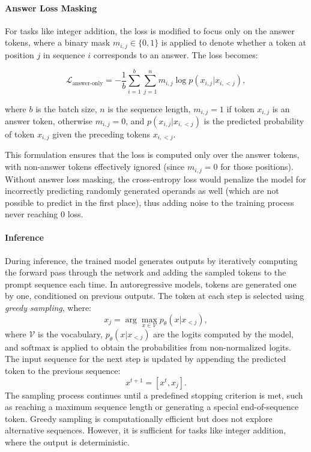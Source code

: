 \paragraph{Answer Loss Masking}
For tasks like integer addition, the loss is modified to focus only on the answer tokens, where a binary mask \( m_{i,j} \in \{0, 1\} \) is applied to denote whether a token at position \( j \) in sequence \( i \) corresponds to an answer. The loss becomes:

\begin{equation*}
    \mathcal{L}_{\text{answer-only}} = -\frac{1}{b} \sum_{i=1}^{b} \sum_{j=1}^{n} m_{i,j} \log p(x_{i,j} | x_{i,<j}),
\end{equation*}

where $b$ is the batch size, $n$ is the sequence length, $m_{i,j} = 1$ if token \( x_{i,j} \) is an answer token, otherwise \( m_{i,j} = 0 \), and \( p(x_{i,j} | x_{i,<j}) \) is the predicted probability of token \( x_{i,j} \) given the preceding tokens \( x_{i,<j} \).

This formulation ensures that the loss is computed only over the answer tokens, with non-answer tokens effectively ignored (since \( m_{i,j} = 0 \) for those positions). Without answer loss masking, the cross-entropy loss would penalize the model for incorrectly predicting randomly generated operands as well (which are not possible to predict in the first place), thus adding noise to the training process never reaching 0 loss.

\paragraph{Inference}
During inference, the trained model generates outputs by iteratively computing the forward pass through the network and adding the sampled tokens to the prompt sequence each time. In autoregressive models, tokens are generated one by one, conditioned on previous outputs. The token at each step is selected using \emph{greedy sampling}, where:
\begin{equation*}
    x_j = \arg\max_{x \in \mathcal{V}} p_{\theta}(x | x_{<j}),
\end{equation*}
where $\mathcal{V}$ is the vocabulary, $p_{\theta}(x | x_{<j})$ are the logits computed by the model, and $\text{softmax}$ is applied to obtain the probabilities from non-normalized logits. The input sequence for the next step is updated by appending the predicted token to the previous sequence:
\begin{equation*}
    x^{t+1} = [x^t, x_j].
\end{equation*}
The sampling process continues until a predefined stopping criterion is met, such as reaching a maximum sequence length or generating a special end-of-sequence token. Greedy sampling is computationally efficient but does not explore alternative sequences. However, it is sufficient for tasks like integer addition, where the output is deterministic.


